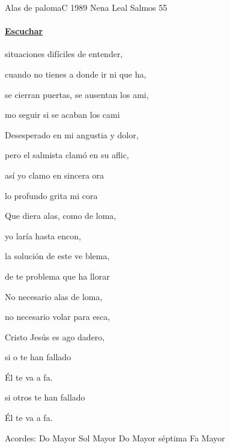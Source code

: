 \documentclass[12pt, spanish]{book}
\newcommand{\NotCCLIed}{\relax}
\begin{document}
    \begin{song}{Alas de paloma}{C}
    {1989 \SBPubDom} %
    {Nena Leal}
    {Salmos 55} %
    {} %
        \ifChordBk
        \paragraph{\mbox{}\hfill\protect\href{https://open.spotify.com/intl-es/track/1AtE6vnEP4LH4mH8a6FQBA}{Escuchar}\mbox{}\hfill}
        \fi

        \begin{SBOpGroup}
             situaciones difíciles de entender,

            cuando no tienes a donde ir ni que ha,

            se cierran puertas, se ausentan los ami,

            mo seguir si se acaban los cami
        \end{SBOpGroup}
        \vskip 20pt
        \begin{SBOpGroup}
            Desesperado en mi angustia y dolor,

            pero el salmista clamó en su aflic,

            así yo clamo en sincera ora

             lo profundo grita mi cora
        \end{SBOpGroup}

        \begin{SBChorus}
            Que  diera alas, como de loma,

            yo laría hasta encon,

            la solución de este ve blema,

            de te problema que  ha llorar
        \end{SBChorus}

        \begin{SBOpGroup}
            No  necesario alas de loma,

            no  necesario volar para esca,

            Cristo Jesús es ago dadero,

            si o te han fallado

            Él  te va a fa.

            si otros te han fallado

            Él  te va a fa.
        \end{SBOpGroup}
        \ifChordBk
        \begin{SBOpGroup}
            Acordes:\break
            \upchord{\C}\qquad Do Mayor \hfill
            \upchord{\G}\qquad Sol Mayor \hfill\null\break
            \upchord{\Cseven}\qquad Do Mayor s\'eptima \hfill
            \upchord{\F}\qquad Fa Mayor \hfill\null\break
        \end{SBOpGroup}
        \fi
    \end{song}
\end{document}
